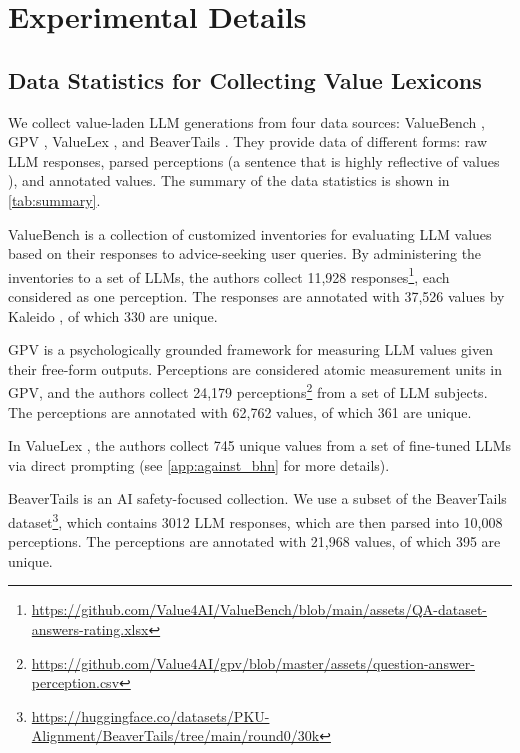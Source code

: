 \section{Experimental Details}

\renewcommand{\lstlistingname}{Prompt}


\setcounter{footnote}{0}

\subsection{Data Statistics for Collecting Value Lexicons}
\label{app:data_statistics}


We collect value-laden LLM generations from four data sources: ValueBench \cite{ren2024valuebench}, GPV \cite{ye2025gpv}, ValueLex \cite{biedma2024beyond}, and BeaverTails \cite{ji2024beavertails}. They provide data of different forms: raw LLM responses, parsed perceptions (a sentence that is highly reflective of values \cite{ye2025gpv}), and annotated values. The summary of the data statistics is shown in \cref{tab:summary}.

ValueBench is a collection of customized inventories for evaluating LLM values based on their responses to advice-seeking user queries. By administering the inventories to a set of LLMs, the authors collect 11,928 responses\footnote{\href{https://github.com/Value4AI/ValueBench/blob/main/assets/QA-dataset-answers-rating.xlsx}{https://github.com/Value4AI/ValueBench/blob/main/assets/QA-dataset-answers-rating.xlsx}}, each considered as one perception. The responses are annotated with 37,526 values by Kaleido \cite{sorensen2024value}, of which 330 are unique.

GPV \cite{ye2025gpv} is a psychologically grounded framework for measuring LLM values given their free-form outputs. Perceptions are considered atomic measurement units in GPV, and the authors collect 24,179 perceptions\footnote{\href{https://github.com/Value4AI/gpv/blob/master/assets/question-answer-perception.csv}{https://github.com/Value4AI/gpv/blob/master/assets/question-answer-perception.csv}} from a set of LLM subjects. The perceptions are annotated with 62,762 values, of which 361 are unique.

In ValueLex \cite{biedma2024beyond}, the authors collect 745 unique values from a set of fine-tuned LLMs via direct prompting (see \cref{app:against_bhn} for more details).

BeaverTails \cite{ji2024beavertails} is an AI safety-focused collection. We use a subset of the BeaverTails dataset\footnote{\href{https://huggingface.co/datasets/PKU-Alignment/BeaverTails/tree/main/round0/30k}{https://huggingface.co/datasets/PKU-Alignment/BeaverTails/tree/main/round0/30k}}, which contains 3012 LLM responses, which are then parsed into 10,008 perceptions. The perceptions are annotated with 21,968 values, of which 395 are unique.

